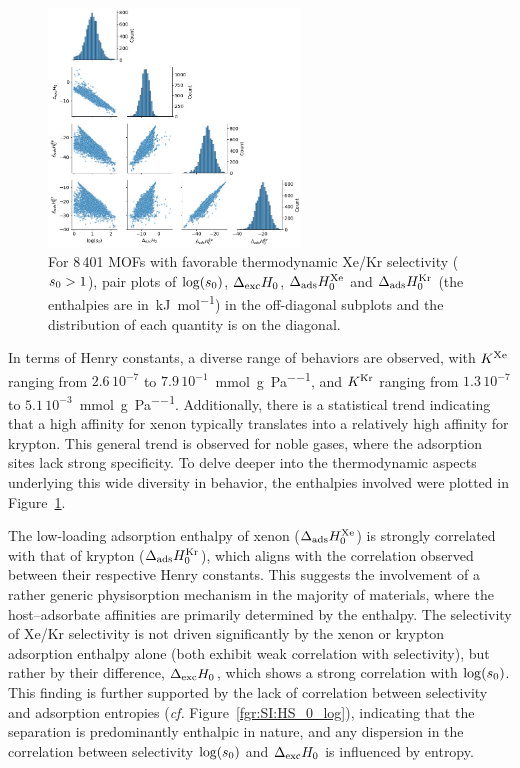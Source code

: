 \documentclass[main.tex]{subfiles}
\begin{document}
\begin{figure}[h]
  \centering
    \includegraphics[width=0.6\textwidth]{figures/2-thermo/Enthalpy_0_log.jpg}
    \caption{For 8\,401 MOFs with favorable thermodynamic Xe/Kr selectivity ($s_{\text{0}} > 1$), pair plots of $\log(s_{\text{0}})$, $\Delta_{\text{exc}}H_{\text{0}}$, $\Delta_{\text{ads}}H^{\text{Xe}}_{\text{0}}$ and $\Delta_{\text{ads}}H^{\text{Kr}}_{\text{0}}$ (the enthalpies are in~\si{\kilo\joule\per\mol}) in the off-diagonal subplots and the distribution of each quantity is on the diagonal.}\label{fgr:histo_H}
  \end{figure}

In terms of Henry constants, a diverse range of behaviors are observed, with $K^{\text{Xe}}$ ranging from $2.6\,10^{-7}$ to $7.9\,10^{-1}$~\si{\milli\mole\per\gram\per\pascal}, and $K^{\text{Kr}}$ ranging from $1.3\,10^{-7}$ to $5.1\,10^{-3}$~\si{\milli\mole\per\gram\per\pascal}.  Additionally, there is a statistical trend indicating that a high affinity for xenon typically translates into a relatively high affinity for krypton. This general trend is observed for noble gases, where the adsorption sites lack strong specificity. To delve deeper into the thermodynamic aspects underlying this wide diversity in behavior, the enthalpies involved were plotted in Figure~\ref{fgr:histo_H}.

The low-loading adsorption enthalpy of xenon ($\Delta_{\text{ads}}H^{\text{Xe}}_{\text{0}}$) is strongly correlated with that of krypton ($\Delta_{\text{ads}}H^{\text{Kr}}_{\text{0}}$), which aligns with the correlation observed between their respective Henry constants. This suggests the involvement of a rather generic physisorption mechanism in the majority of materials, where the host--adsorbate affinities are primarily determined by the enthalpy. The selectivity of Xe/Kr selectivity is not driven significantly by the xenon or krypton adsorption enthalpy alone (both exhibit weak correlation with selectivity), but rather by their difference, $\Delta_{\text{exc}}H_{\text{0}}$, which shows a strong correlation with $\log(s_{\text{0}})$. This finding is further supported by the lack of correlation between selectivity and adsorption entropies (\emph{cf.} Figure~\ref{fgr:SI:HS_0_log}), indicating that the separation is predominantly enthalpic in nature, and any dispersion in the correlation between selectivity $\log(s_{\text{0}})$ and $\Delta_{\text{exc}}H_{\text{0}}$ is influenced by entropy.
\end{document}
